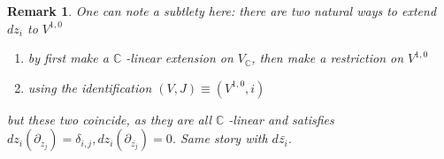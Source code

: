 \documentclass[11pt]{article}
\newtheorem{remark}{Remark}
\begin{document}
\begin{remark}
One can note a subtlety here: there are two natural ways to extend \(dz_i\) to \(V^{1,0}\)
\begin{enumerate}
\item by first make a \(\mathbb{C}\) -linear extension on \(V_{\mathbb{C}}\), then make a restriction on \(V^{1,0}\)
\item using the identification \((V,J)\equiv (V^{1,0},i)\)
\end{enumerate}
but these two coincide, as they are all \(\mathbb{C}\) -linear and satisfies \(dz_i(\partial_{z_j}) =
\delta_{i,j}, dz_i(\partial_{\bar{z_j}}) = 0\). Same story with \(d\bar{z_i}\).
\end{remark}

\end{document}
